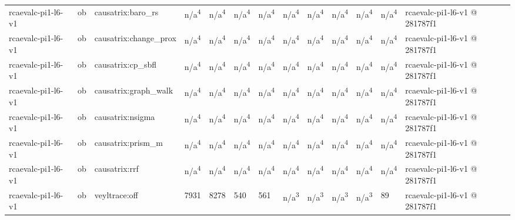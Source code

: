 \begin{table}[t]
\begin{tabular}{lllllllllllll}
rcaevalc-pi1-l6-v1 & ob & causatrix:baro\_rs & n/a\textsuperscript{4} & n/a\textsuperscript{4} & n/a\textsuperscript{4} & n/a\textsuperscript{4} & n/a\textsuperscript{4} & n/a\textsuperscript{4} & n/a\textsuperscript{4} & n/a\textsuperscript{4} & n/a\textsuperscript{4} & rcaevalc-pi1-l6-v1 @ 281787f1 \\
rcaevalc-pi1-l6-v1 & ob & causatrix:change\_prox & n/a\textsuperscript{4} & n/a\textsuperscript{4} & n/a\textsuperscript{4} & n/a\textsuperscript{4} & n/a\textsuperscript{4} & n/a\textsuperscript{4} & n/a\textsuperscript{4} & n/a\textsuperscript{4} & n/a\textsuperscript{4} & rcaevalc-pi1-l6-v1 @ 281787f1 \\
rcaevalc-pi1-l6-v1 & ob & causatrix:cp\_sbfl & n/a\textsuperscript{4} & n/a\textsuperscript{4} & n/a\textsuperscript{4} & n/a\textsuperscript{4} & n/a\textsuperscript{4} & n/a\textsuperscript{4} & n/a\textsuperscript{4} & n/a\textsuperscript{4} & n/a\textsuperscript{4} & rcaevalc-pi1-l6-v1 @ 281787f1 \\
rcaevalc-pi1-l6-v1 & ob & causatrix:graph\_walk & n/a\textsuperscript{4} & n/a\textsuperscript{4} & n/a\textsuperscript{4} & n/a\textsuperscript{4} & n/a\textsuperscript{4} & n/a\textsuperscript{4} & n/a\textsuperscript{4} & n/a\textsuperscript{4} & n/a\textsuperscript{4} & rcaevalc-pi1-l6-v1 @ 281787f1 \\
rcaevalc-pi1-l6-v1 & ob & causatrix:nsigma & n/a\textsuperscript{4} & n/a\textsuperscript{4} & n/a\textsuperscript{4} & n/a\textsuperscript{4} & n/a\textsuperscript{4} & n/a\textsuperscript{4} & n/a\textsuperscript{4} & n/a\textsuperscript{4} & n/a\textsuperscript{4} & rcaevalc-pi1-l6-v1 @ 281787f1 \\
rcaevalc-pi1-l6-v1 & ob & causatrix:prism\_m & n/a\textsuperscript{4} & n/a\textsuperscript{4} & n/a\textsuperscript{4} & n/a\textsuperscript{4} & n/a\textsuperscript{4} & n/a\textsuperscript{4} & n/a\textsuperscript{4} & n/a\textsuperscript{4} & n/a\textsuperscript{4} & rcaevalc-pi1-l6-v1 @ 281787f1 \\
rcaevalc-pi1-l6-v1 & ob & causatrix:rrf & n/a\textsuperscript{4} & n/a\textsuperscript{4} & n/a\textsuperscript{4} & n/a\textsuperscript{4} & n/a\textsuperscript{4} & n/a\textsuperscript{4} & n/a\textsuperscript{4} & n/a\textsuperscript{4} & n/a\textsuperscript{4} & rcaevalc-pi1-l6-v1 @ 281787f1 \\
rcaevalc-pi1-l6-v1 & ob & veyltrace:off & 7931 & 8278 & 540 & 561 & n/a\textsuperscript{3} & n/a\textsuperscript{3} & n/a\textsuperscript{3} & n/a\textsuperscript{3} & 89 & rcaevalc-pi1-l6-v1 @ 281787f1 \\

\end{tabular}
\end{table}
